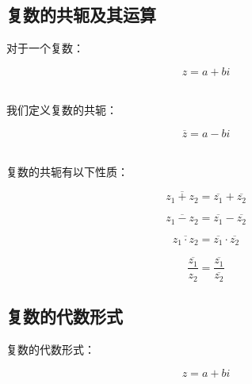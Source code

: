 \documentclass[UTF8]{ctexart}
\begin{document}
\subsection{复数的共轭及其运算}
    对于一个复数：
    \begin{large}
        \begin{equation*}
            z=a+bi
        \end{equation*}
    \end{large}\\
    我们定义复数的共轭：
    \begin{large}
        \begin{equation*}
            \overline{z}=a-bi
        \end{equation*}
    \end{large}\\
    复数的共轭有以下性质：
    \begin{large}
        \begin{equation*}
            \overline{z_1+z_2}=\overline{z_1}+\overline{z_2}
        \end{equation*}
    \end{large}
    \begin{large}
        \begin{equation*}
            \overline{z_1-z_2}=\overline{z_1}-\overline{z_2}
        \end{equation*}
    \end{large}
    \begin{large}
        \begin{equation*}
            \overline{z_1\cdot z_2}=\overline{z_1}\cdot \overline{z_2}
        \end{equation*}
    \end{large}
    \begin{large}
        \begin{equation*}
            \overline{\frac{z_1}{z_2}}=\frac{\overline{z_1}}{\overline{z_2}}
        \end{equation*}
    \end{large}

\newpage

\subsection{复数的代数形式}
    复数的代数形式：
    \begin{large}
        \begin{equation*}
            z=a+bi
        \end{equation*}
    \end{large}
\end{document}
